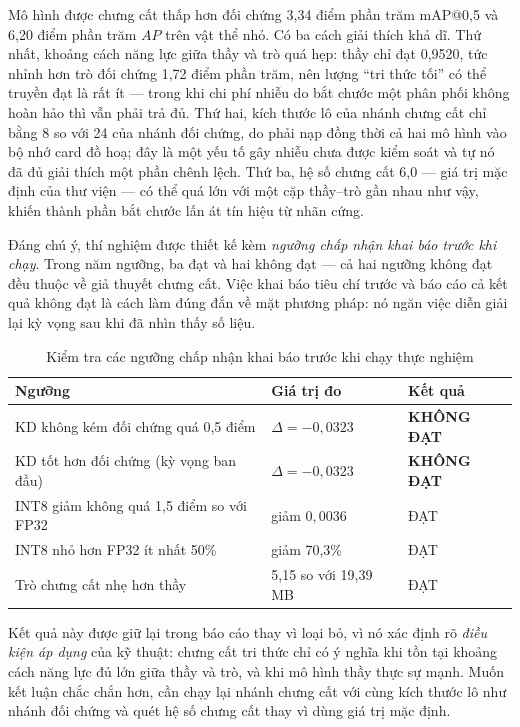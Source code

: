 Mô hình được chưng cất thấp hơn đối chứng 3,34 điểm phần trăm mAP@0,5 và 6,20 điểm phần trăm $AP$
trên vật thể nhỏ. Có ba cách giải thích khả dĩ. Thứ nhất, khoảng cách năng lực giữa thầy và trò quá
hẹp: thầy chỉ đạt 0,9520, tức nhỉnh hơn trò đối chứng 1,72 điểm phần trăm, nên lượng ``tri thức
tối'' có thể truyền đạt là rất ít --- trong khi chi phí nhiễu do bắt chước một phân phối không hoàn
hảo thì vẫn phải trả đủ. Thứ hai, kích thước lô của nhánh chưng cất chỉ bằng 8 so với 24 của nhánh
đối chứng, do phải nạp đồng thời cả hai mô hình vào bộ nhớ card đồ hoạ; đây là một yếu tố gây nhiễu
chưa được kiểm soát và tự nó đã đủ giải thích một phần chênh lệch. Thứ ba, hệ số chưng cất 6,0 ---
giá trị mặc định của thư viện --- có thể quá lớn với một cặp thầy--trò gần nhau như vậy, khiến
thành phần bắt chước lấn át tín hiệu từ nhãn cứng.

Đáng chú ý, thí nghiệm được thiết kế kèm \emph{ngưỡng chấp nhận khai báo trước khi chạy}. Trong năm
ngưỡng, ba đạt và hai không đạt --- cả hai ngưỡng không đạt đều thuộc về giả thuyết chưng cất. Việc
khai báo tiêu chí trước và báo cáo cả kết quả không đạt là cách làm đúng đắn về mặt phương pháp: nó
ngăn việc diễn giải lại kỳ vọng sau khi đã nhìn thấy số liệu.

\begin{table}[H]
\centering
\caption{Kiểm tra các ngưỡng chấp nhận khai báo trước khi chạy thực nghiệm}
\label{tab:e3_thresh}
\small
\begin{tabular}{lll}
\toprule
\textbf{Ngưỡng} & \textbf{Giá trị đo} & \textbf{Kết quả} \\
\midrule
KD không kém đối chứng quá 0,5 điểm      & $\Delta = -0{,}0323$ & \textbf{KHÔNG ĐẠT} \\
KD tốt hơn đối chứng (kỳ vọng ban đầu)   & $\Delta = -0{,}0323$ & \textbf{KHÔNG ĐẠT} \\
INT8 giảm không quá 1,5 điểm so với FP32 & giảm $0{,}0036$      & ĐẠT \\
INT8 nhỏ hơn FP32 ít nhất 50\%           & giảm 70,3\%          & ĐẠT \\
Trò chưng cất nhẹ hơn thầy               & 5,15 so với 19,39 MB & ĐẠT \\
\bottomrule
\end{tabular}
\end{table}

Kết quả này được giữ lại trong báo cáo thay vì loại bỏ, vì nó xác định rõ \emph{điều kiện áp dụng}
của kỹ thuật: chưng cất tri thức chỉ có ý nghĩa khi tồn tại khoảng cách năng lực đủ lớn giữa thầy và
trò, và khi mô hình thầy thực sự mạnh. Muốn kết luận chắc chắn hơn, cần chạy lại nhánh chưng cất với
cùng kích thước lô như nhánh đối chứng và quét hệ số chưng cất thay vì dùng giá trị mặc định.

